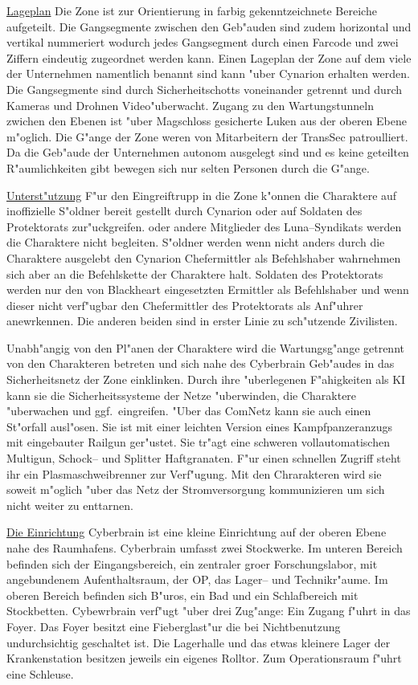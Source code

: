 \underline{Lageplan} Die Zone ist zur Orientierung in farbig gekenntzeichnete Bereiche aufgeteilt. Die Gangsegmente zwischen den Geb"auden sind zudem horizontal und vertikal nummeriert wodurch jedes Gangsegment durch einen Farcode und zwei Ziffern eindeutig zugeordnet werden kann. Einen Lageplan der Zone auf dem viele der Unternehmen namentlich benannt sind kann "uber Cynarion erhalten werden. Die Gangsegmente sind durch Sicherheitschotts voneinander getrennt und durch Kameras und Drohnen Video"uberwacht. Zugang zu den Wartungstunneln zwichen den Ebenen ist "uber Magschloss gesicherte Luken aus der oberen Ebene m"oglich. Die G"ange der Zone weren von Mitarbeitern der TransSec patroulliert. Da die Geb"aude der Unternehmen autonom ausgelegt sind und es keine geteilten R"aumlichkeiten gibt bewegen sich nur selten Personen durch die G"ange.

\underline{Unterst"utzung} F"ur den Eingreiftrupp in die Zone k"onnen die Charaktere auf inoffizielle S"oldner bereit gestellt durch Cynarion oder auf Soldaten des Protektorats zur"uckgreifen. \xl{} oder andere Mitglieder des Luna--Syndikats werden die Charaktere nicht begleiten. S"oldner werden wenn nicht anders durch die Charaktere ausgelebt den Cynarion Chefermittler als Befehlshaber wahrnehmen sich aber an die Befehlskette der Charaktere halt. Soldaten des Protektorats werden nur den von Blackheart eingesetzten Ermittler als Befehlshaber und wenn dieser nicht verf"ugbar den Chefermittler des Protektorats als Anf"uhrer anewrkennen. Die anderen beiden sind in erster Linie zu sch"utzende Zivilisten.

\underline{\xl} Unabh"angig von den Pl"anen der Charaktere wird \xl{} die Wartungsg"ange getrennt von den Charakteren betreten und sich nahe des Cyberbrain Geb"audes in das Sicherheitsnetz der Zone einklinken. Durch ihre "uberlegenen F"ahigkeiten als KI kann sie die Sicherheitssysteme der Netze "uberwinden, die Charaktere "uberwachen und ggf.~eingreifen. "Uber das ComNetz kann sie auch einen St"orfall ausl"osen. Sie ist mit einer leichten Version eines Kampfpanzeranzugs mit eingebauter Railgun ger"ustet. Sie tr"agt eine schweren vollautomatischen Multigun, Schock-- und Splitter Haftgranaten. F"ur einen schnellen Zugriff steht ihr ein Plasmaschwei\3brenner zur Verf"ugung. Mit den Chrarakteren wird sie soweit m"oglich "uber das Netz der Stromversorgung kommunizieren um sich nicht weiter zu enttarnen.

\underline{Die Einrichtung} Cyberbrain ist eine kleine Einrichtung auf der oberen Ebene nahe des Raumhafens. Cyberbrain umfasst zwei Stockwerke. Im unteren Bereich befinden sich der Eingangsbereich, ein zentraler gro\3er Forschungslabor, mit angebundenem Aufenthaltsraum, der OP, das Lager-- und Technikr"aume. Im oberen Bereich befinden sich B"uros, ein Bad und ein Schlafbereich mit Stockbetten. Cybewrbrain verf"ugt "uber drei Zug"ange: Ein Zugang f"uhrt in das Foyer. Das Foyer besitzt eine Fieberglast"ur die bei Nichtbenutzung undurchsichtig geschaltet ist. Die Lagerhalle und das etwas kleinere Lager der Krankenstation besitzen jeweils ein eigenes Rolltor. Zum Operationsraum f"uhrt eine Schleuse.

